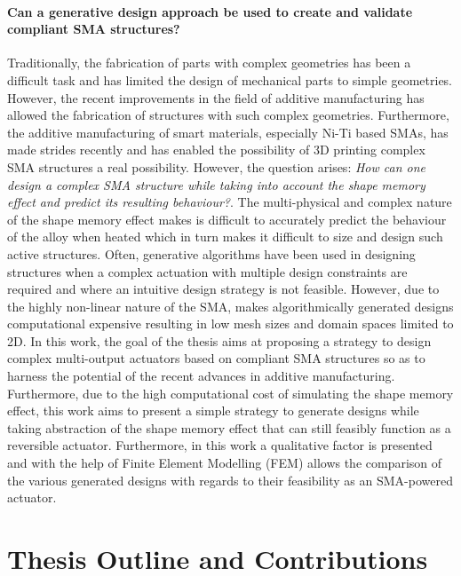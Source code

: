 \paragraph{Can a generative design approach be used to create and validate compliant SMA structures?}
Traditionally, the fabrication of parts with complex geometries has been a difficult task and has limited the design of mechanical parts to simple geometries. However, the recent improvements in the field of additive manufacturing has allowed the fabrication of structures with such complex geometries. Furthermore, the additive manufacturing of smart materials, especially Ni-Ti based SMAs, has made strides recently and has enabled the possibility of 3D printing complex SMA structures a real possibility. However, the question arises: \textit{How can one design a complex SMA structure while taking into account the shape memory effect and predict its resulting behaviour?}. The multi-physical and complex nature of the shape memory effect makes is difficult to accurately predict the behaviour of the alloy when heated which in turn makes it difficult to size and design such active structures. Often, generative algorithms have been used in designing structures when a complex actuation with multiple design constraints are required and where an intuitive design strategy is not feasible. However, due to the highly non-linear nature of the SMA, makes algorithmically generated designs computational expensive resulting in low mesh sizes and domain spaces limited to 2D. In this work, the goal of the thesis aims at proposing a strategy to design complex multi-output actuators based on compliant SMA structures so as to harness the potential of the recent advances in additive manufacturing. Furthermore, due to the high computational cost of simulating the shape memory effect, this work aims to present a simple strategy to generate designs while taking abstraction of the shape memory effect that can still feasibly function as a reversible actuator. Furthermore, in this work a qualitative factor is presented and with the help of Finite Element Modelling (FEM) allows the comparison of the various generated designs with regards to their feasibility as an SMA-powered actuator.

\section*{Thesis Outline and Contributions}
